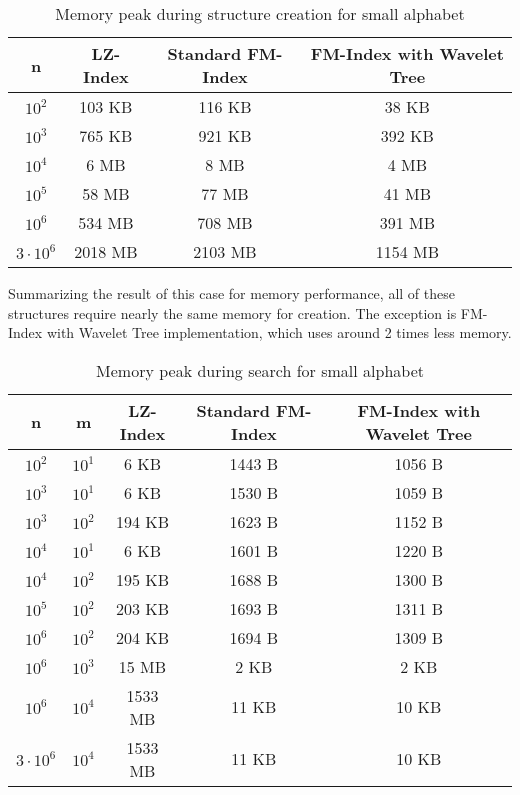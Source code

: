 \begin{table}[H]
\begin{center}
\caption{Memory peak during structure creation for small alphabet}
\begin{tabular}{|c|c|c|c|}
\hline
\rowcolor[HTML]{C0C0C0}
n & LZ-Index & Standard FM-Index & FM-Index with Wavelet Tree \\ \hline
$10^{2}$ & 103 KB & 116 KB & 38 KB \\ \hline
$10^{3}$ & 765 KB & 921 KB & 392 KB \\ \hline
$10^{4}$ & 6 MB & 8 MB & 4 MB \\ \hline
$10^{5}$ & 58 MB & 77 MB & 41 MB \\ \hline
$10^{6}$ & 534 MB & 708 MB & 391 MB \\ \hline
$3 \cdot 10^{6}$ & 2018 MB & 2103 MB & 1154 MB \\ \hline
\end{tabular}
\end{center}
\end{table}

Summarizing the result of this case for memory performance, all of these structures require nearly the same memory for creation. The exception is FM-Index with Wavelet Tree implementation, which uses around 2 times less memory.

\begin{table}[H]
\begin{center}
\caption{Memory peak during search for small alphabet}
\begin{tabular}{|c|c|c|c|c|}
\hline
\rowcolor[HTML]{C0C0C0}
n & m & LZ-Index & Standard FM-Index & FM-Index with Wavelet Tree \\ \hline
$10^{2}$ & $10^{1}$ & 6 KB & 1443 B & 1056 B \\ \hline
$10^{3}$ & $10^{1}$ & 6 KB & 1530 B & 1059 B \\ \hline
$10^{3}$ & $10^{2}$ & 194 KB & 1623 B & 1152 B \\ \hline
$10^{4}$ & $10^{1}$ & 6 KB & 1601 B & 1220 B \\ \hline
$10^{4}$ & $10^{2}$ & 195 KB & 1688 B & 1300 B \\ \hline
$10^{5}$ & $10^{2}$ & 203 KB & 1693 B & 1311 B \\ \hline
$10^{6}$ & $10^{2}$ & 204 KB & 1694 B & 1309 B \\ \hline
$10^{6}$ & $10^{3}$ & 15 MB & 2 KB & 2 KB \\ \hline
$10^{6}$ & $10^{4}$ & 1533 MB & 11 KB & 10 KB \\ \hline
$3 \cdot 10^{6}$ & $10^{4}$ & 1533 MB & 11 KB & 10 KB \\ \hline
\end{tabular}
\end{center}
\end{table}

